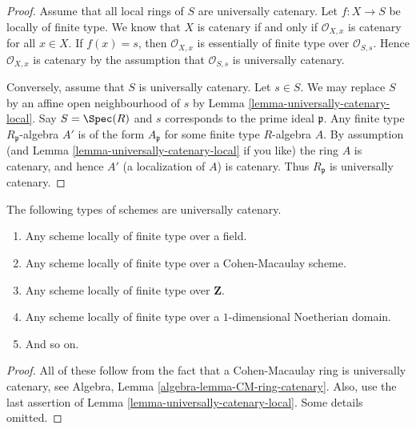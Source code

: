 \begin{proof}
Assume that all local rings of $S$ are universally catenary.
Let $f : X \to S$ be locally of finite type.
We know that $X$ is catenary if and only if $\mathcal{O}_{X, x}$ is
catenary for all $x \in X$. If $f(x) = s$, then $\mathcal{O}_{X, x}$
is essentially of finite type over $\mathcal{O}_{S, s}$. Hence
$\mathcal{O}_{X, x}$ is catenary by the assumption that
$\mathcal{O}_{S, s}$ is universally catenary.

\medskip\noindent
Conversely, assume that $S$ is universally catenary. Let $s \in S$.
We may replace $S$ by an affine open neighbourhood of $s$ by
Lemma \ref{lemma-universally-catenary-local}. Say $S = \Spec(R)$
and $s$ corresponds to the prime ideal $\mathfrak p$. Any finite
type $R_{\mathfrak p}$-algebra $A'$ is of the form
$A_{\mathfrak p}$ for some finite type $R$-algebra $A$.
By assumption (and Lemma \ref{lemma-universally-catenary-local} if you like)
the ring $A$ is catenary, and hence $A'$ (a localization of $A$) is
catenary. Thus $R_{\mathfrak p}$ is universally catenary.
\end{proof}

\begin{lemma}
\label{lemma-ubiquity-uc}
The following types of schemes are universally catenary.
\begin{enumerate}
\item Any scheme locally of finite type over a field.
\item Any scheme locally of finite type over a Cohen-Macaulay scheme.
\item Any scheme locally of finite type over $\mathbf{Z}$.
\item Any scheme locally of finite type over a $1$-dimensional
Noetherian domain.
\item And so on.
\end{enumerate}
\end{lemma}

\begin{proof}
All of these follow from the fact that a
Cohen-Macaulay ring is universally catenary, see
Algebra, Lemma \ref{algebra-lemma-CM-ring-catenary}.
Also, use the last assertion of
Lemma \ref{lemma-universally-catenary-local}.
Some details omitted.
\end{proof}























